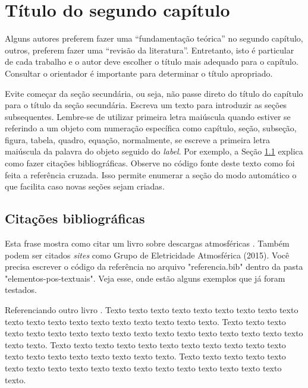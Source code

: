 \chapter{Título do segundo capítulo}
\label{cap:fundamentacao-teorica}

Alguns autores preferem fazer uma ``fundamentação teórica'' no segundo capítulo, outros, preferem fazer uma ``revisão da literatura''. Entretanto, isto é particular de cada trabalho e o autor deve escolher o título mais adequado para o capítulo. Consultar o orientador é importante para determinar o título apropriado.

Evite começar da seção secundária, ou seja, não passe direto do título do capítulo para o título da seção secundária. Escreva um texto para introduzir as seções subsequentes. Lembre-se de utilizar primeira letra maiúscula quando estiver se referindo a um objeto com numeração específica como capítulo, seção, subseção, figura, tabela, quadro, equação, normalmente, se escreve a primeira letra maiúscula da palavra do objeto seguido do \textit{label}. Por exemplo, a Seção \ref{sec:citacoes} explica como fazer citações bibliográficas. Observe no código fonte deste texto como foi feita a referência cruzada. Isso permite enumerar a seção do modo automático o que facilita caso novas seções sejam criadas.  

\section{Citações bibliográficas}\label{sec:citacoes}

    Esta frase mostra como citar um livro sobre descargas atmosféricas \cite{rakov2003lightning}. Também podem ser citados \textit{sites} como \nocite{elat2015densidade}Grupo de Eletricidade Atmosférica (2015). Você precisa escrever o código da referência no arquivo "referencia.bib" dentro da pasta "elementos-pos-textuais". Veja esse, onde estão alguns exemplos que já foram testados.        

    Referenciando outro livro \cite{LangtangenLogg2017}. Texto texto texto texto texto texto texto texto texto texto texto texto texto texto texto texto texto texto texto. Texto texto texto texto texto texto texto texto texto texto texto texto texto texto texto texto texto texto texto. Texto texto texto texto texto texto texto texto texto texto texto texto texto texto texto texto texto texto texto. Texto texto texto texto texto texto texto texto texto texto texto texto texto texto texto texto texto texto texto.

